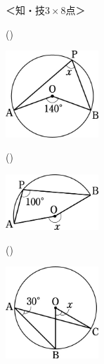 \documentclass[
  12pt,a4paper,lualatex,ja=standard]{bxjsarticle}
\begin{document}
\begin{flushleft}
%
\begin{flushright}%
\footnotesize{＜知・技$3 \times 8$点＞}%
\end{flushright}%


\begin{multicols}{2}

()\hspace{2.5pt}

\begin{center}
\def\@captype{figure}
\includegraphics[width=35mm]{img/image1.jpg}

\end{center}

\columnbreak

()\hspace{2.5pt}

\begin{center}
\def\@captype{figure}
\includegraphics[width=35mm]{img/image2.jpg}

\end{center}

\end{multicols}

\vfill

\begin{multicols}{2}
()\hspace{2.5pt}

\begin{center}
\def\@captype{figure}
\includegraphics[width=35mm]{img/image3.jpg}


\end{center}
\end{multicols}
\end{flushleft}
\end{document}

